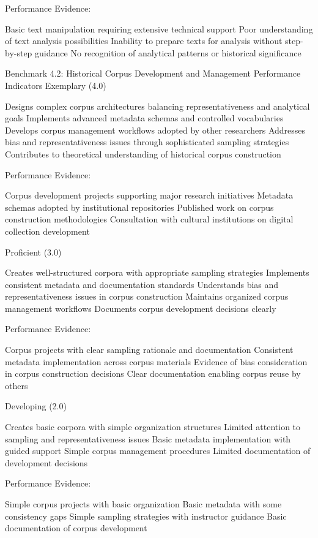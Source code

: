 \begin{appendices}
Performance Evidence:

Basic text manipulation requiring extensive technical support
Poor understanding of text analysis possibilities
Inability to prepare texts for analysis without step-by-step guidance
No recognition of analytical patterns or historical significance

Benchmark 4.2: Historical Corpus Development and Management
Performance Indicators
Exemplary (4.0)

Designs complex corpus architectures balancing representativeness and analytical goals
Implements advanced metadata schemas and controlled vocabularies
Develops corpus management workflows adopted by other researchers
Addresses bias and representativeness issues through sophisticated sampling strategies
Contributes to theoretical understanding of historical corpus construction

Performance Evidence:

Corpus development projects supporting major research initiatives
Metadata schemas adopted by institutional repositories
Published work on corpus construction methodologies
Consultation with cultural institutions on digital collection development

Proficient (3.0)

Creates well-structured corpora with appropriate sampling strategies
Implements consistent metadata and documentation standards
Understands bias and representativeness issues in corpus construction
Maintains organized corpus management workflows
Documents corpus development decisions clearly

Performance Evidence:

Corpus projects with clear sampling rationale and documentation
Consistent metadata implementation across corpus materials
Evidence of bias consideration in corpus construction decisions
Clear documentation enabling corpus reuse by others

Developing (2.0)

Creates basic corpora with simple organization structures
Limited attention to sampling and representativeness issues
Basic metadata implementation with guided support
Simple corpus management procedures
Limited documentation of development decisions

Performance Evidence:

Simple corpus projects with basic organization
Basic metadata with some consistency gaps
Simple sampling strategies with instructor guidance
Basic documentation of corpus development


\end{appendices}
